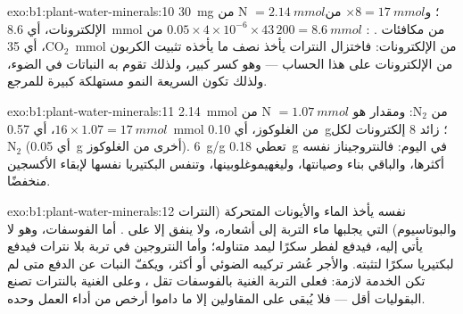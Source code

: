\begin{solution}{exo:b1:plant-water-minerals:10}
\qty{30}{mg} من N $= \qty{2.14}{mmol}$؛ و$\times 8 = \qty{17}{mmol}$ من
الإلكترونات، أي \qty{8.6}{mmol} من مكافئات . : $0.05\times
4\times 10^{-6}\times 43\,200 = \qty{8.6}{mmol}$ من $\mathrm{CO_2}$،
أي \qty{35}{mmol} من الإلكترونات: فاختزال النترات يأخذ نصف ما
يأخذه تثبيت الكربون من الإلكترونات على هذا الحساب --- وهو كسر كبير،
ولذلك تقوم به النباتات في الضوء، ولذلك تكون  السريعة النمو
مستهلكة كبيرة للمرجع.
\end{solution}

\begin{solution}{exo:b1:plant-water-minerals:11}
\qty{2.14}{mmol} من N $= \qty{1.07}{mmol}$ من $\mathrm{N_2}$: ومقدار 
هو $16\times 1.07 = \qty{17}{mmol}$، أي \qty{0.57}{mmol} من الغلوكوز،
أي \qty{0.10}{g}؛ زائد 8 إلكترونات لكل $\mathrm{N_2}$ (أي
\qty{0.05}{g} أخرى من الغلوكوز).  \qty{6}{g/g} تعطي
\qty{0.18}{g} في اليوم: فالنتروجيناز نفسه أكثرها، والباقي بناء
 وصيانتها، وليغهيموغلوبينها، وتنفس البكتيريا نفسها لإبقاء
الأكسجين منخفضًا.
\end{solution}

\begin{solution}{exo:b1:plant-water-minerals:12}
 نفسه يأخذ الماء والأيونات المتحركة (النترات والبوتاسيوم) التي
يجلبها ماء التربة إلى أشعاره، ولا ينفق  إلا على .
أما الفوسفات، وهو لا يأتي إليه، فيدفع لفطر سكرًا ليمد متناوله؛ وأما
النتروجين في تربة بلا نترات فيدفع لبكتيريا سكرًا لتثبته. والأجر
عُشر تركيبه الضوئي أو أكثر، ويكفّ النبات عن الدفع متى لم تكن
الخدمة لازمة: فعلى التربة الغنية بالفوسفات تقل ، وعلى
الغنية بالنترات تصنع البقوليات  أقل --- فلا يُبقى على
المقاولين إلا ما داموا أرخص من أداء العمل وحده.
\end{solution}

